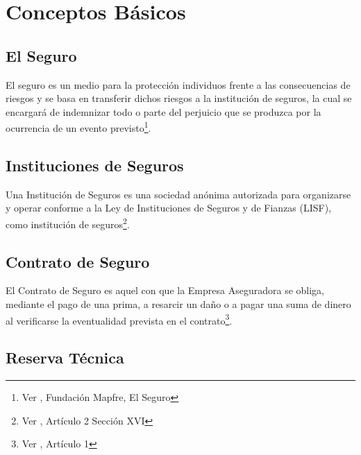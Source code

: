 \documentclass[11pt,twoside,openright,spanish]{report}
\numberwithin{equation}{chapter}
\numberwithin{figure}{chapter}
\numberwithin{table}{chapter}
\begin{document}
	\chapter{Conceptos Básicos}

	\section{El Seguro}
	El seguro es un medio para la protección individuos frente a las consecuencias de riesgos y se basa en transferir dichos riesgos a la institución de seguros, la cual se encargará de indemnizar todo o parte del perjuicio que se produzca por la ocurrencia de un evento previsto\footnote{Ver \citet{ASeguro}, Fundación Mapfre, El Seguro}.
	
	\section{Instituciones de Seguros}

	Una Institución de Seguros es una sociedad anónima autorizada para organizarse y operar conforme a la Ley de Instituciones de Seguros y de Fianzas (LISF), como institución de seguros\footnote{Ver \citet{BAseguradora}, Artículo 2 Sección XVI}.

 
	
	\section{Contrato de Seguro}
	
	El Contrato de Seguro es aquel con que la Empresa Aseguradora se obliga, mediante el pago de una prima, a resarcir un daño o a pagar una suma de dinero al verificarse la eventualidad prevista en el contrato\footnote{Ver \citet{CContrato}, Artículo 1}.
	
	\section{Reserva Técnica}
\end{document}
